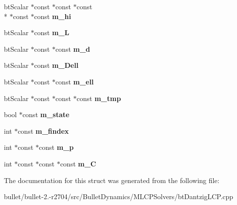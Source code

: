 \begin{DoxyCompactItemize}
\item 
\hypertarget{structbt_l_c_p_a85a59f1bd03c3b8adfaa200efa1f7574}{bt\+Scalar $\ast$const $\ast$const $\ast$const \\*
$\ast$const $\ast$const {\bfseries m\+\_\+hi}}\label{structbt_l_c_p_a85a59f1bd03c3b8adfaa200efa1f7574}

\item 
\hypertarget{structbt_l_c_p_a3c564417864dd18fe487d4e49b8666ec}{bt\+Scalar $\ast$const {\bfseries m\+\_\+\+L}}\label{structbt_l_c_p_a3c564417864dd18fe487d4e49b8666ec}

\item 
\hypertarget{structbt_l_c_p_a78fbbc01b23f5f9e37d73653dc6ba75b}{bt\+Scalar $\ast$const $\ast$const {\bfseries m\+\_\+d}}\label{structbt_l_c_p_a78fbbc01b23f5f9e37d73653dc6ba75b}

\item 
\hypertarget{structbt_l_c_p_a7236e12b27304697136aebf726da726a}{bt\+Scalar $\ast$const {\bfseries m\+\_\+\+Dell}}\label{structbt_l_c_p_a7236e12b27304697136aebf726da726a}

\item 
\hypertarget{structbt_l_c_p_a52629c175f180aa86d966e21c13648a9}{bt\+Scalar $\ast$const $\ast$const {\bfseries m\+\_\+ell}}\label{structbt_l_c_p_a52629c175f180aa86d966e21c13648a9}

\item 
\hypertarget{structbt_l_c_p_aa4b88ed1357c6b8455bddfcf217a4881}{bt\+Scalar $\ast$const $\ast$const $\ast$const {\bfseries m\+\_\+tmp}}\label{structbt_l_c_p_aa4b88ed1357c6b8455bddfcf217a4881}

\item 
\hypertarget{structbt_l_c_p_a177c7bb2e8b2ac4a200e5ad675c258d3}{bool $\ast$const {\bfseries m\+\_\+state}}\label{structbt_l_c_p_a177c7bb2e8b2ac4a200e5ad675c258d3}

\item 
\hypertarget{structbt_l_c_p_a5295ef7e1ffa36784a58aa19387804de}{int $\ast$const {\bfseries m\+\_\+findex}}\label{structbt_l_c_p_a5295ef7e1ffa36784a58aa19387804de}

\item 
\hypertarget{structbt_l_c_p_a8639bff9e8a3a8089d23bc79b9662495}{int $\ast$const $\ast$const {\bfseries m\+\_\+p}}\label{structbt_l_c_p_a8639bff9e8a3a8089d23bc79b9662495}

\item 
\hypertarget{structbt_l_c_p_a6eb0424fda803fe87963911b48c6f826}{int $\ast$const $\ast$const $\ast$const {\bfseries m\+\_\+\+C}}\label{structbt_l_c_p_a6eb0424fda803fe87963911b48c6f826}

\end{DoxyCompactItemize}


The documentation for this struct was generated from the following file\+:\begin{DoxyCompactItemize}
\item 
bullet/bullet-\/2.-\/r2704/src/\+Bullet\+Dynamics/\+M\+L\+C\+P\+Solvers/bt\+Dantzig\+L\+C\+P.\+cpp\end{DoxyCompactItemize}
